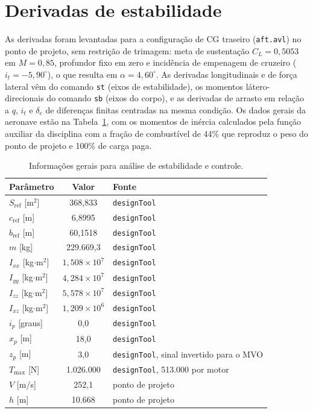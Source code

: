 \newpage
\section{Derivadas de estabilidade}

As derivadas foram levantadas para a configuração de CG traseiro
(\texttt{aft.avl}) no ponto de projeto, sem restrição de trimagem: meta de
sustentação $C_L = 0{,}5053$ em $M = 0{,}85$, profundor fixo em zero e
incidência de empenagem de cruzeiro ($i_t = -5{,}90^\circ$), o que resulta
em $\alpha = 4{,}60^\circ$. As derivadas longitudinais e de força lateral
vêm do comando \texttt{st} (eixos de estabilidade), os momentos
látero-direcionais do comando \texttt{sb} (eixos do corpo), e as derivadas
de arrasto em relação a $q$, $i_t$ e $\delta_e$ de diferenças finitas
centradas na mesma condição. Os dados gerais da aeronave estão na
Tabela~\ref{tab:dados_gerais}, com os momentos de inércia calculados pela
função auxiliar da disciplina com a fração de combustível de 44\% que
reproduz o peso do ponto de projeto e 100\% de carga paga.

\begin{table}[H]
\centering
\caption{Informações gerais para análise de estabilidade e controle.}\label{tab:dados_gerais}
\renewcommand{\arraystretch}{1.25}
\begin{tabular}{lcl}
\toprule
Parâmetro & Valor & Fonte \\
\midrule
$S_{\mathrm{ref}}$ [m$^2$] & 368,833 & \texttt{designTool} \\
$c_{\mathrm{ref}}$ [m] & 6,8995 & \texttt{designTool} \\
$b_{\mathrm{ref}}$ [m] & 60,1518 & \texttt{designTool} \\
$m$ [kg] & 229.669,3 & \texttt{designTool} \\
$I_{xx}$ [kg$\cdot$m$^2$] & $1{,}508\times 10^{7}$ & \texttt{designTool} \\
$I_{yy}$ [kg$\cdot$m$^2$] & $4{,}284\times 10^{7}$ & \texttt{designTool} \\
$I_{zz}$ [kg$\cdot$m$^2$] & $5{,}578\times 10^{7}$ & \texttt{designTool} \\
$I_{xz}$ [kg$\cdot$m$^2$] & $1{,}209\times 10^{6}$ & \texttt{designTool} \\
$i_p$ [graus] & 0,0 & \texttt{designTool} \\
$x_p$ [m] & 18,0 & \texttt{designTool} \\
$z_p$ [m] & 3,0 & \texttt{designTool}, sinal invertido para o MVO \\
$T_{\mathrm{max}}$ [N] & 1.026.000 & \texttt{designTool}, 513.000 por motor \\
$V$ [m/s] & 252,1 & ponto de projeto \\
$h$ [m] & 10.668 & ponto de projeto \\
\bottomrule
\end{tabular}
\end{table}

